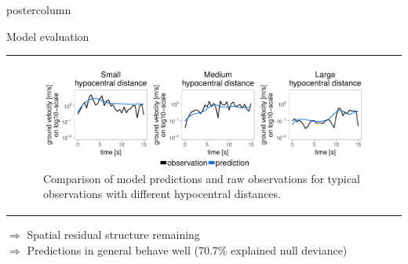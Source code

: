 \documentclass[final,hyperref={pdfpagelabels=false}]{beamer}
\newcommand{\bfBlue}[1]{\textcolor{koaladarkestblue}{\textbf{#1}}}
\newcommand*\circled[1]{\tikz[baseline=(char.base)]{
\node[shape=circle,draw,inner sep=2pt] (char) {#1};}}
\begin{document}
\begin{frame}
\begin{columns}
\begin{column}{1\textwidth}
\begin{columns}[T]
\begin{column}{.484\textwidth}
\begin{beamercolorbox}[center,wd=\textwidth]{postercolumn}
\begin{minipage}[T]{.95\textwidth}
\begin{block}{\footnotesize \circled{3} Model evaluation}
\begin{center}
\begin{tabularx}{0.975\linewidth}{Z}
  \begin{figure}[!ht]\centering
  \includegraphics[width=0.6\linewidth]{figures/predictions}
  \caption{\footnotesize Comparison of model predictions and raw observations for typical observations with different hypocentral distances.}
  \end{figure}
\end{tabularx}
\end{center}

\vspace{-2ex}
\textcolor{koaladarkblue}{$\Rightarrow$} Spatial residual structure remaining \\[0.15cm]
\textcolor{koaladarkblue}{$\Rightarrow$} Predictions in general behave well (70.7\% explained null deviance)

\end{block}


\end{minipage}
\end{beamercolorbox}
\end{column}
\end{columns}
\end{column}
\end{columns}
\end{frame}
\end{document}
